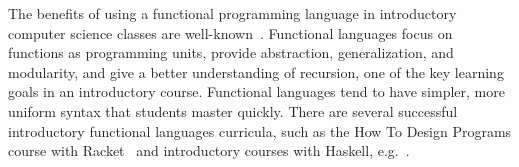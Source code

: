 \documentclass[submission,copyright,creativecommons]{eptcs}
\newcommand{\allcomments}[1]{{#1}}
\newcommand{\elenacomment}[1]{{\bf \textcolor{ForestGreen}{\allcomments{{#1}}}}}
\newcommand{\stephencomment}[1]{{\bf \color{StephensBlue}{\allcomments{{#1}}}}} %
\newcommand{\todo}[1]{{\bf \color{magenta}{\allcomments{ To-do: {#1}}}}}
\begin{document}

The benefits of using a functional programming language in introductory computer science classes are well-known~\cite{thomsonEducation}. Functional languages focus on functions as programming units, provide abstraction, generalization, and modularity, and give a better understanding of recursion, one of the key learning goals in an introductory course. 
Functional languages tend to have simpler, more uniform syntax that students master quickly. There are several successful introductory functional languages curricula, such as the How To Design Programs course with %
 Racket~\cite{htdp} and introductory courses with Haskell, e.g.~\cite{haskell}.

\end{document}
